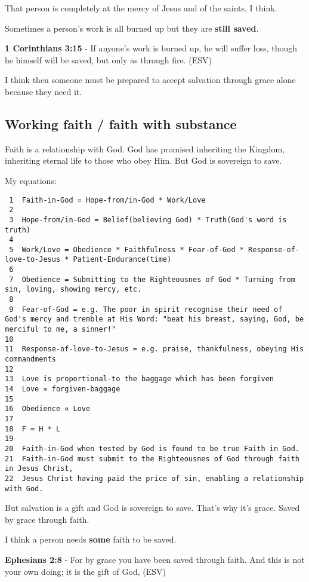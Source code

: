 \documentclass[11pt]{article}
\begin{document}
That person is completely at the mercy of Jesus and of the saints, I think.

Sometimes a person's work is all burned up but they are \textbf{still saved}.

\textbf{1 Corinthians 3:15} - If anyone's work is burned up, he will suffer loss, though he himself will be saved, but only as through fire. (ESV)

I think then someone must be prepared to accept salvation through grace alone because they need it.

\subsection{Working faith / faith with substance}
\label{sec:orgabd8798}

Faith is a relationship with God. God has promised inheriting the Kingdom, inheriting eternal life to those who obey Him. But God is sovereign to save.

My equations:

\begin{verbatim}
 1  Faith-in-God = Hope-from/in-God * Work/Love
 2  
 3  Hope-from/in-God = Belief(believing God) * Truth(God's word is truth)
 4  
 5  Work/Love = Obedience * Faithfulness * Fear-of-God * Response-of-love-to-Jesus * Patient-Endurance(time)
 6  
 7  Obedience = Submitting to the Righteousnes of God * Turning from sin, loving, showing mercy, etc.
 8  
 9  Fear-of-God = e.g. The poor in spirit recognise their need of God's mercy and tremble at His Word: "beat his breast, saying, God, be merciful to me, a sinner!"
10  
11  Response-of-love-to-Jesus = e.g. praise, thankfulness, obeying His commandments
12  
13  Love is proportional-to the baggage which has been forgiven
14  Love ∝ forgiven-baggage
15  
16  Obedience ∝ Love
17  
18  F = H * L
19  
20  Faith-in-God when tested by God is found to be true Faith in God.
21  Faith-in-God must submit to the Righteousnes of God through faith in Jesus Christ,
22  Jesus Christ having paid the price of sin, enabling a relationship with God.
\end{verbatim}

But salvation is a gift and God is sovereign to save.
That's why it's grace.
Saved by grace through faith.

I think a person needs \textbf{some} faith to be saved.

\textbf{Ephesians 2:8} - For by grace you have been saved through faith. And this is not your own doing; it is the gift of God, (ESV)
\end{document}
